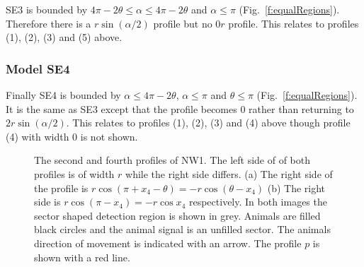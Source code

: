 SE3 is bounded by $4\pi - 2\theta \le \alpha \le 4\pi - 2\theta$ and $\alpha \le \pi$ (Fig.~\ref{f:equalRegions}). Therefore there is a $r\sin(\alpha/2)$ profile but no $0r$ profile. This relates to profiles (1), (2), (3) and (5) above.



\subsubsection{Model SE4} \label{SE4}

Finally SE4 is bounded by  $\alpha \le 4\pi - 2\theta $, $\alpha\le\pi$ and $\theta \le \pi$ (Fig.~\ref{f:equalRegions}). It is the same as SE3 except that the profile becomes 0 rather than returning to $2r\sin(\alpha/2)$. This relates to profiles (1), (2), (3) and (4) above though profile (4) with width 0 is not shown.




\begin{figure}[t]
  \centering
{
}
\caption[The second and fourth profiles of NW1]{
The second and fourth profiles of NW1. 
The left side of of both profiles is of width $r$ while the right side differs. 
(a) The right side of the profile is $r\cos(\pi+x_4-\theta) = - r\cos(\theta - x_4 )$ 
(b) The right side is $r\cos(\pi-x_4) = - r\cos x_4$ respectively. 
In both images the sector shaped detection region is shown in grey. 
Animals are filled black circles and the animal signal is an unfilled sector. 
The animals direction of movement is indicated with an arrow. 
The profile $p$ is shown with a red line. 
}
\label{f:NW1}
\end{figure}

